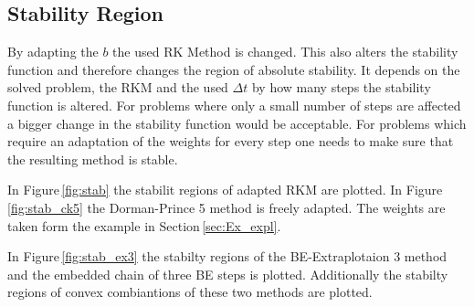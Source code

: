 \documentclass[a4paper]{article}
\numberwithin{equation}{section}
\theoremstyle{plain}
\theoremstyle{definition}
\numberwithin{theorem}{section}
\newcommand{\dt}{{\Delta t}}
\newcommand{\1}{\mathbbm{1}}
\begin{document}
\subsection{Stability Region}

By adapting the $b$ the used RK Method is changed. This also alters the stability function and therefore changes the region of absolute stability. 
It depends on the solved problem, the RKM and the used $\dt$ by how many steps the stability function is altered. For problems where only a small number of steps are affected a bigger change in the stability function would be acceptable. For problems which require an adaptation of the weights for every step one needs to make sure that the resulting method is stable.

In Figure\,\ref{fig:stab} the stabilit regions of adapted RKM are plotted. 
In Figure\,\ref{fig:stab_ck5} the Dorman-Prince 5 method is freely adapted. 
The weights are taken form the example in Section\,\ref{sec:Ex_expl}. 

In Figure\,\ref{fig:stab_ex3} the stabilty regions of the BE-Extraplotaion 3 method and the embedded chain of three BE steps is plotted. Additionally the stabilty regions of convex combiantions of these two methods are plotted.
\end{document}
